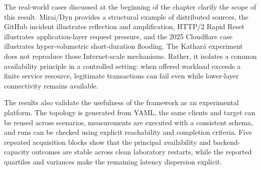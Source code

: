 The real-world cases discussed at the beginning of the chapter clarify the
scope of this result. Mirai/Dyn provides a structural example of distributed
sources, the GitHub incident illustrates reflection and amplification, HTTP/2
Rapid Reset illustrates application-layer request pressure, and the 2025
Cloudflare case illustrates hyper-volumetric short-duration flooding. The
Kathar\'a experiment does not reproduce those Internet-scale mechanisms.
Rather, it isolates a common availability principle in a controlled setting:
when offered workload exceeds a finite service resource, legitimate
transactions can fail even while lower-layer connectivity remains available.

The results also validate the usefulness of the framework as an experimental
platform. The topology is generated from YAML, the same clients and target can
be reused across scenarios, measurements are executed with a consistent schema,
and runs can be checked using explicit reachability and completion criteria.
Five repeated acquisition blocks show that the principal availability and
backend-capacity outcomes are stable across clean laboratory restarts, while
the reported quartiles and variances make the remaining latency dispersion
explicit.
